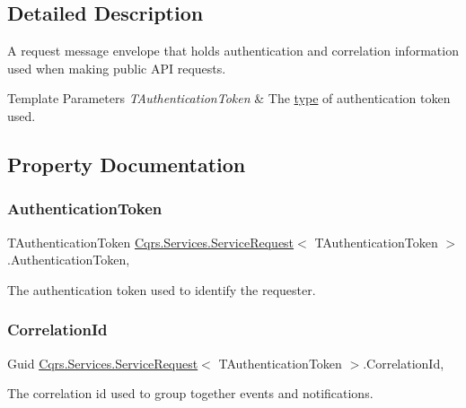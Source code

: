 \subsection{Detailed Description}
A request message envelope that holds authentication and correlation information used when making public A\+PI requests. 


\begin{DoxyTemplParams}{Template Parameters}
{\em T\+Authentication\+Token} & The \hyperlink{}{type} of authentication token used.\\
\hline
\end{DoxyTemplParams}


\subsection{Property Documentation}
\mbox{\label{classCqrs_1_1Services_1_1ServiceRequest_ac1a9faff43be83d010b5b59a849c4c4b_ac1a9faff43be83d010b5b59a849c4c4b}} 
\subsubsection{\texorpdfstring{Authentication\+Token}{AuthenticationToken}}
{\footnotesize\ttfamily T\+Authentication\+Token \hyperlink{classCqrs_1_1Services_1_1ServiceRequest}{Cqrs.\+Services.\+Service\+Request}$<$ T\+Authentication\+Token $>$.Authentication\+Token\hspace{0.3cm}{\ttfamily [get]}, {\ttfamily [set]}}



The authentication token used to identify the requester. 

\mbox{\label{classCqrs_1_1Services_1_1ServiceRequest_abbf7a905744ac65ab59edf4f550cad61_abbf7a905744ac65ab59edf4f550cad61}} 
\subsubsection{\texorpdfstring{Correlation\+Id}{CorrelationId}}
{\footnotesize\ttfamily Guid \hyperlink{classCqrs_1_1Services_1_1ServiceRequest}{Cqrs.\+Services.\+Service\+Request}$<$ T\+Authentication\+Token $>$.Correlation\+Id\hspace{0.3cm}{\ttfamily [get]}, {\ttfamily [set]}}



The correlation id used to group together events and notifications. 

